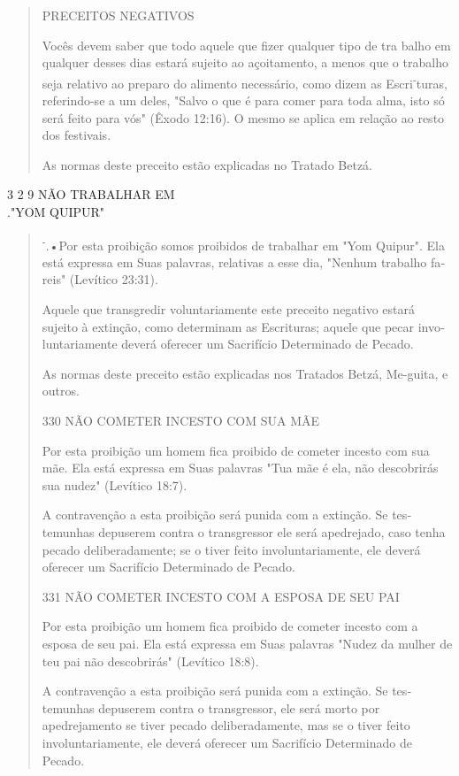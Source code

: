 \begin{quote}
PRECEITOS NEGATIVOS

Vocês devem saber que todo aquele que fizer qualquer tipo de tra balho
em qualquer desses dias estará sujeito ao açoitamento, a menos que o
trabalho seja relativo ao preparo do alimento necessário, como dizem as
Escri­\textsuperscript{-}turas, referindo-se a um deles, "Salvo o que é
para comer para toda alma, isto só será feito para vós" (Êxodo 12:16). O
mesmo se aplica em relação ao resto dos festivais.

As normas deste preceito estão explicadas no Tratado Betzá.
\end{quote}

3 2 9 NÃO TRABALHAR EM\\
."YOM QUIPUR"

\begin{quote}
\textsuperscript{-}.•Por esta proibição somos proibidos de trabalhar em
"Yom Quipur". Ela está expressa em Suas palavras, relativas a esse dia,
"Nenhum trabalho fa­reis" (Levítico 23:31).

Aquele que transgredir voluntariamente este preceito negativo esta­rá
sujeito à extinção, como determinam as Escrituras; aquele que pecar
invo­luntariamente deverá oferecer um Sacrifício Determinado de Pecado.

As normas deste preceito estão explicadas nos Tratados Betzá, Me-guita,
e outros.

330 NÃO COMETER INCESTO COM SUA MÃE

Por esta proibição um homem fica proibido de cometer incesto com sua
mãe. Ela está expressa em Suas palavras "Tua mãe é ela, não descobrirás
sua nudez" (Levítico 18:7).

A contravenção a esta proibição será punida com a extinção. Se
tes­temunhas depuserem contra o transgressor ele será apedrejado, caso
tenha pe­cado deliberadamente; se o tiver feito involuntariamente, ele
deverá oferecer um Sacrifício Determinado de Pecado.

331 NÃO COMETER INCESTO COM A ESPOSA DE SEU PAI

Por esta proibição um homem fica proibido de cometer incesto com a
esposa de seu pai. Ela está expressa em Suas palavras "Nudez da mulher
de teu pai não descobrirás" (Levítico 18:8).

A contravenção a esta proibição será punida com a extinção. Se
tes­temunhas depuserem contra o transgressor, ele será morto por
apedrejamento se tiver pecado deliberadamente, mas se o tiver feito
involuntariamente, ele de­verá oferecer um Sacrifício Determinado de
Pecado.


\end{quote}
